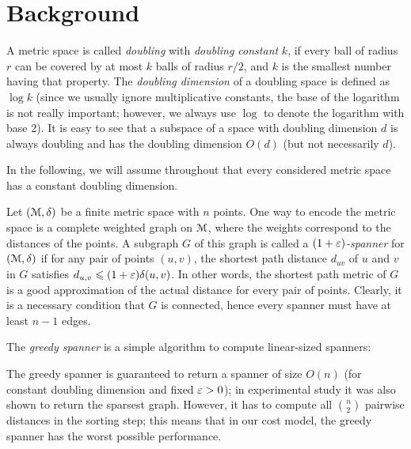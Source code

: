 \section{Background}
%
A metric space is called \textit{doubling} with \textit{doubling constant} $k$,
if every ball of radius $r$ can be covered by at most $k$ balls of radius $r/2$,
and $k$ is the smallest number having that property.
The \textit{doubling dimension} of a doubling space is defined as $\log k$
(since we usually ignore multiplicative constants, the base of the logarithm is not really important; however,
we always use $\log$ to denote the logarithm with base 2).
It is easy to see that a subspace of a space with doubling dimension $d$ 
is always doubling and has the doubling dimension $O(d)$ (but not necessarily $d$).

In the following, we will assume throughout that every considered metric space
has a constant doubling dimension.


%
Let $(\mathcal{M}, \delta)$ be a finite metric space with $n$ points. 
One way to encode the metric space is a complete weighted graph on $\mathcal{M}$,
where the weights correspond to the distances of the points.
A subgraph $G$ of this graph is called a \emph{$(1+\varepsilon)$-spanner} for $(\mathcal{M},\delta)$ 
if for any pair of points $(u,v)$,
the shortest path distance $d_{uv}$ of $u$ and $v$ in $G$ satisfies $d_{u,v}\leqslant (1+\varepsilon)\delta(u,v)$.
In other words, the shortest path metric of $G$ is a good approximation of the actual distance for every pair of points.
Clearly, it is a necessary condition that $G$ is connected, hence every spanner must have at least $n-1$ edges.

The \emph{greedy spanner} \cite{althofer1993sparse} is a simple algorithm to compute linear-sized spanners:
\begin{algorithmic}
\label{alg:greedy_spanner}
    \EndIf
    \EndFor
\EndFunction
\end{algorithmic}

The greedy spanner is guaranteed \cite{althofer1993sparse} to return a spanner of size $O(n)$
(for constant doubling dimension and fixed $\varepsilon>0$); in experimental study \cite{farshi2009experimental}
it was also shown to return the sparsest graph.  However, it
has to compute all $\binom{n}{2}$ pairwise distances in the sorting step;
this means that in our cost model, the greedy spanner has the worst possible
performance.

